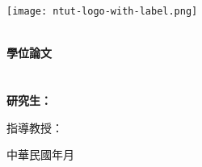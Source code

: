 \begin{titlepage}
    \newpage
    \begin{center}
        \texttt{[image: ntut-logo-with-label.png]}
        
        \huge\bf\deptCname\\%
        \huge\bf\degreeCname 學位論文\\%

        \vfill
        \huge\bf\cTitle\\ %
        \LARGE\bf\eTitle\\ %

        \vfill
        {\Large 研究生：\myCname}

        \vfill
        {\Large 指導教授：\advisorCname}

        \vfill
        {\Large 中華民國{\cYear 年}{\cMonth 月}}
    \end{center}
\end{titlepage}